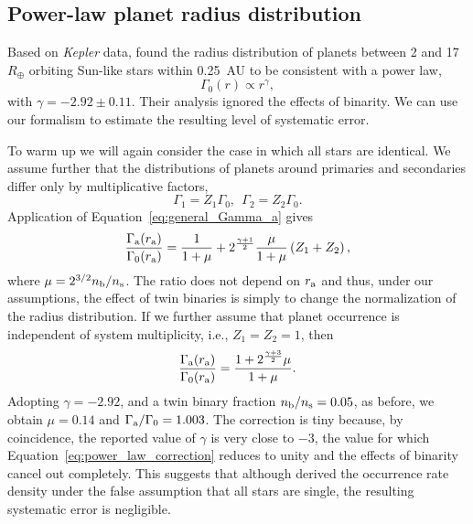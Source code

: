 \documentclass[12pt,modern]{aastex61}
\renewcommand{\a}{_{\rm a}}
\newcommand{\s}{_{\rm s}}
\renewcommand{\b}{_{\rm b}}
\begin{document}
\subsection{Power-law planet radius distribution}
\label{sec:model_2}

Based on {\it Kepler} data, \citet{howard_planet_2012} found the
radius distribution of planets between 2 and 17~$R_\oplus$ orbiting Sun-like
stars within 0.25\, AU to be consistent with a power law,
\begin{equation}
  \Gamma_0(r) \propto r^\gamma,
\label{eqn:power_law}
\end{equation}
with $\gamma=-2.92\pm 0.11$.  Their analysis ignored the effects of
binarity.  We can use our formalism to estimate the resulting level of
systematic error.

To warm up we will again consider the case in which all stars are
identical.  We assume further that the distributions of planets around
primaries and secondaries differ only by multiplicative factors,
\begin{equation}
    \Gamma_1 = Z_1 \Gamma_0,~~\Gamma_2 = Z_2 \Gamma_0.
\end{equation}
Application of Equation~\ref{eq:general_Gamma_a} gives
\begin{equation}
    \frac{\Gamma\a(r\a)}{\Gamma_0(r\a)} = 
    \frac{1}{1+\mu}
    +
    2^{\frac{\gamma+1}{2} } \frac{\mu}{1+\mu} \left(Z_1 + Z_2\right),
    \label{eq:model5_apparent_rate_density}
\end{equation}
where $\mu = 2^{3/2} n\b/n\s$.  The ratio does not depend on $r\a$ and
thus, under our assumptions, the effect of twin binaries is simply to
change the normalization of the radius distribution.  If we further
assume that planet occurrence is independent of system multiplicity,
i.e., $Z_1=Z_2=1$, then
\begin{equation}
    \frac{\Gamma\a(r\a)}{\Gamma_0(r\a)} = 
    \frac{1 + 2^{\frac{\gamma+3}{2}}\mu}{1 + \mu}.
    \label{eq:power_law_correction}
\end{equation}
Adopting $\gamma=-2.92$, and a twin binary fraction $n\b/n\s=0.05$, as
before, we obtain $\mu = 0.14$ and $\Gamma\a/\Gamma_0 = 1.003$.  The
correction is tiny because, by coincidence, the reported value of
$\gamma$ is very close to $-3$, the value for which
Equation~\ref{eq:power_law_correction} reduces to unity and the
effects of binarity cancel out completely.  This suggests that
although \citet{howard_planet_2012} derived the occurrence rate
density under the false assumption that all stars are single, the
resulting systematic error is negligible.
\end{document}
